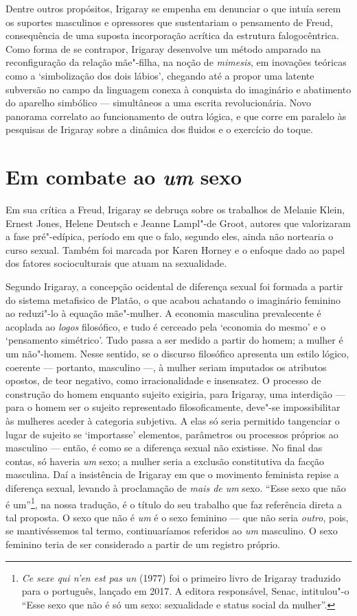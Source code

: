 Dentre outros propósitos, Irigaray se empenha em denunciar o que intuía
serem os suportes masculinos e opressores que sustentariam o pensamento
de Freud, consequência de uma suposta incorporação acrítica da estrutura
falogocêntrica. Como forma de se contrapor, Irigaray desenvolve um
método amparado na reconfiguração da relação mãe"-filha, na noção de
\emph{mimesis}, em inovações teóricas como a `simbolização dos dois
lábios', chegando até a propor uma latente subversão no campo da
linguagem conexa à conquista do imaginário e abatimento do aparelho
simbólico --- simultâneos a uma escrita revolucionária. Novo panorama
correlato ao funcionamento de outra lógica, e que corre em paralelo às
pesquisas de Irigaray sobre a dinâmica dos fluidos e o exercício do
toque.

\section{Em combate ao \emph{um} sexo}

Em sua crítica a Freud, Irigaray se debruça sobre os trabalhos de
Melanie Klein, Ernest Jones, Helene Deutsch e Jeanne Lampl"-de Groot,
autores que valorizaram a fase pré"-edípica, período em que o falo,
segundo eles, ainda não nortearia o curso sexual. Também foi marcada por
Karen Horney e o enfoque dado ao papel dos fatores socioculturais que
atuam na sexualidade.

Segundo Irigaray, a concepção ocidental de diferença sexual foi formada
a partir do sistema metafisico de Platão, o que acabou achatando o
imaginário feminino ao reduzi"-lo à equação mãe"-mulher. A economia
masculina prevalecente é acoplada ao \emph{logos} filosófico, e tudo é
cerceado pela `economia do mesmo' e o `pensamento simétrico'. Tudo passa
a ser medido a partir do homem; a mulher é um não"-homem. Nesse sentido,
se o discurso filosófico apresenta um estilo lógico, coerente ---
portanto, masculino ---, à mulher seriam imputados os atributos opostos,
de teor negativo, como irracionalidade e insensatez. O processo de
construção do homem enquanto sujeito exigiria, para Irigaray, uma
interdição --- para o homem ser o sujeito representado filosoficamente,
deve"-se impossibilitar às mulheres aceder à categoria subjetiva. A elas
só seria permitido tangenciar o lugar de sujeito se `importasse'
elementos, parâmetros ou processos próprios ao masculino --- então, é
como se a diferença sexual não existisse. No final das contas, só
haveria \emph{um} sexo; a mulher seria a exclusão constitutiva da facção
masculina. Daí a insistência de Irigaray em que o movimento feminista
repise a diferença sexual, levando à proclamação de \emph{mais de um}
sexo. ``Esse sexo que não é um''\footnote{\emph{Ce sexe qui n'en est pas
  un} (1977) foi o primeiro livro de Irigaray traduzido para o
  português, lançado em 2017. A editora responsável, Senac, intitulou"-o
  ``Esse sexo que não é só um sexo: sexualidade e status social da
  mulher''.}, na nossa tradução, é o título do seu trabalho que faz
referência direta a tal proposta. O sexo que não é \emph{um} é o sexo
feminino --- que não seria \emph{outro}, pois, se mantivéssemos tal
termo, continuaríamos referidos ao \emph{um} masculino. O sexo feminino
teria de ser considerado a partir de um registro próprio.


